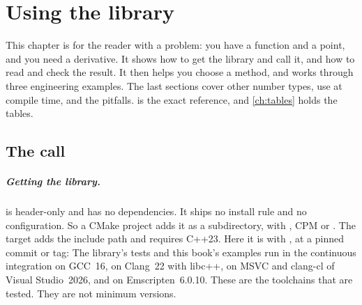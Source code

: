 \chapter{Using the library}\label{ch:using}

This chapter is for the reader with a problem: you have a function and a point, and you need a derivative. It shows
how to get the library and call it, and how to read and check the result. It then helps you choose a method, and works
through three engineering examples. The last sections cover other number types, use at compile time, and the
pitfalls.  is the exact reference, and \cref{ch:tables} holds the tables.

\section{The call}\label{sec:using-call}

\paragraph{Getting the library.} \nxx{} is header-only and has no dependencies. It ships no install rule and no
 configuration. So a CMake project adds it as a subdirectory, with , CPM or
. The target  adds the include path and requires C++23. Here it is with
, at a pinned commit or tag:
The library's tests and this book's examples run in the continuous integration on GCC~16, on Clang~22 with libc++, on
MSVC and clang-cl of Visual Studio~2026, and on Emscripten~6.0.10. These are the toolchains that are tested. They are
not minimum versions.

